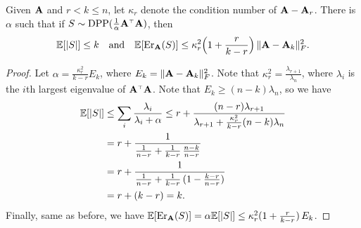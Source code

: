 \documentclass{article}
\begin{document}
  
  \begin{theorem}\label{t:upper_conditionnum}
Given $\mathbf A$ and $r<k\leq n$, let $\kappa_r$ denote the condition
    number of $\mathbf A-\mathbf A_{r}$. There is $\alpha$ such
    that if $S\sim \DPP(\frac1\alpha\A^\top\A)$, then
    \begin{align*}
\mathbb E[|S|]\leq k\quad\text{and}\quad \mathbb E[\mathrm{Er}_\mathbf A(S)] \leq
      \kappa_r^2\Big(1+\frac r{k-r}\Big)\,\|\mathbf A-\mathbf A_k\|_F^2.
      \end{align*}
    \end{theorem}
    \begin{proof}
      Let $\alpha=\frac{\kappa_r^2}{k-r}E_k$, where
      $E_k=\|\mathbf A-\mathbf A_k\|_F^2$. Note that
      $\kappa_r^2=\frac{\lambda_{r+1}}{\lambda_n}$, where $\lambda_i$ is
      the $i$th largest eigenvalue of $\A^\top\A$. Note that $E_k\geq
      (n-k)\lambda_n$, so we have
      \begin{align*}
        \mathbb E[|S|]&\leq \sum_i\frac{\lambda_i}{\lambda_i+\alpha}\leq r +
        \frac{(n-r)\lambda_{r+1}}{\lambda_{r+1}+
        \frac{\kappa_r^2}{k-r}(n-k)\lambda_n}\\
               &=r + \frac{1}{\frac1{n-r} + \frac1{k-r}\,\frac{n-k}{n-r}} \\
        &=r + \frac{1}{\frac1{n-r} + \frac1{k-r}\,(1 - \frac{k-r}{n-r})} \\
& =  r + (k-r)= k.
\end{align*}
Finally, same as before, we have $\mathbb E[\mathrm{Er}_\mathbf A(S)]=\alpha\mathbb E[|S|]\leq
\kappa_r^2(1+\frac r{k-r})\,E_k$.
    \end{proof}
\end{document}
